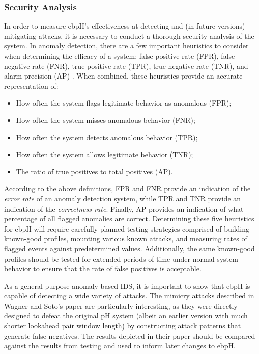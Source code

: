 \documentclass[
  12pt]{findlay}
\providecommand{\tightlist}{\setlength{\itemsep}{0pt}\setlength{\parskip}{0pt}}
\begin{document}
\hypertarget{security-analysis}{%
\subsubsection{Security Analysis}\label{security-analysis}}

\label{security_analysis_section}

In order to measure ebpH's effectiveness at detecting and (in future
versions) mitigating attacks, it is necessary to conduct a thorough
security analysis of the system. In anomaly detection, there are a few
important heuristics to consider when determining the efficacy of a
system: false positive rate (FPR), false negative rate (FNR), true
positive rate (TPR), true negative rate (TNR), and alarm precision (AP)
\autocite{vanoorschot19}. When combined, these heuristics provide an
accurate representation of:

\begin{itemize}
\tightlist
\item
  How often the system flags legitimate behavior as anomalous (FPR);
\item
  How often the system misses anomalous behavior (FNR);
\item
  How often the system detects anomalous behavior (TPR);
\item
  How often the system allows legitimate behavior (TNR);
\item
  The ratio of true positives to total positives (AP).
\end{itemize}

According to the above definitions, FPR and FNR provide an indication of
the \emph{error rate} of an anomaly detection system, while TPR and TNR
provide an indication of the \emph{correctness rate}. Finally, AP
provides an indication of what percentage of all flagged anomalies are
correct. Determining these five heuristics for ebpH will require
carefully planned testing strategies comprised of building known-good
profiles, mounting various known attacks, and measuring rates of flagged
events against predetermined values. Additionally, the same known-good
profiles should be tested for extended periods of time under normal
system behavior to ensure that the rate of false positives is
acceptable.

As a general-purpose anomaly-based IDS, it is important to show that
ebpH is capable of detecting a wide variety of attacks. The mimicry
attacks described in Wagner and Soto's paper \autocite{wagner02} are
particularly interesting, as they were directly designed to defeat the
original pH system (albeit an earlier version with much shorter
lookahead pair window length) by constructing attack patterns that
generate false negatives. The results depicted in their paper should be
compared against the results from testing and used to inform later
changes to ebpH.
\end{document}
